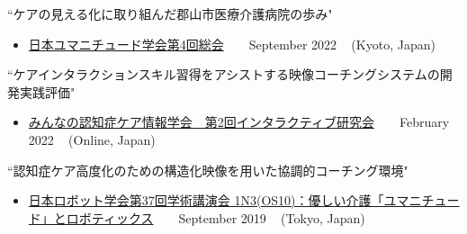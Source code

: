 \begin{talks}


	\talk
	{``ケアの見える化に取り組んだ郡山市医療介護病院の歩み"}
	{
	\begin{itemize}[leftmargin=.4in]
	    \item \href{https://jhuma.org/}{日本ユマニチュード学会第4回総会} ~ \lbrack\href{https://jhuma.org/soukai4report/}{\small{\websiteSymbol}}\rbrack ~
	    \hfill September 2022 ~ (Kyoto, Japan)
	\end{itemize}
	}

	\talk
	{``ケアインタラクションスキル習得をアシストする映像コーチングシステムの開発実践評価"}
	{
	\begin{itemize}[leftmargin=.4in]
	    \item \href{https://cihcd.jp/}{みんなの認知症ケア情報学会　第2回インタラクティブ研究会} ~ \lbrack\href{https://cihcd.jp/index.php/24709/interactive-seminar-2/}{\small{\websiteSymbol}}\rbrack ~
	    \hfill February 2022 ~ (Online, Japan)
	\end{itemize}
	}


	\talk
	{``認知症ケア高度化のための構造化映像を用いた協調的コーチング環境"}
	{
	\begin{itemize}[leftmargin=.4in]
	    \item \href{https://ac.rsj-web.org/2019/}{日本ロボット学会第37回学術講演会 1N3(OS10)：優しい介護「ユマニチュード」とロボティックス} ~ \lbrack\href{https://ac.rsj-web.org/2019/os.html\#OS10}{\small{\websiteSymbol}}\rbrack ~
	    \hfill September 2019 ~ (Tokyo, Japan)
	\end{itemize}
	}


\end{talks}
